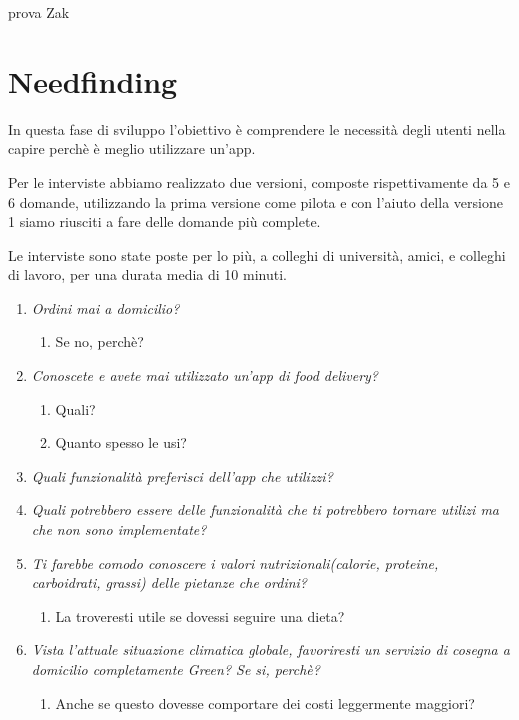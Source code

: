 \documentclass{article}
\begin{document}
prova Zak

    \vspace{1cm}
\section{Needfinding} 
In questa fase di sviluppo l’obiettivo è comprendere le necessità degli utenti nella capire perchè è meglio utilizzare un'app.
    \vspace{1cm}
     \par
\par Per le interviste abbiamo realizzato due versioni, composte rispettivamente da 5 e 6 domande, utilizzando la prima versione come pilota e con l'aiuto della versione 1 siamo riusciti a fare delle domande più complete. \par Le interviste sono state poste per lo più, a colleghi di università, amici, e colleghi di lavoro, per una durata media di 10 minuti.\par
  \vspace{1cm}
\par{}
    \begin{enumerate}
    
     \item \textit{Ordini mai a domicilio?}
        \begin{enumerate}
            \item Se no, perchè?
        \end{enumerate}
     \item \textit{Conoscete e avete mai utilizzato un'app di food delivery?}
     \begin{enumerate}
         \item Quali?
         \item Quanto spesso le usi?
     \end{enumerate}
     \item \textit{Quali funzionalità preferisci dell'app che utilizzi?}
     \item \textit{Quali potrebbero essere delle funzionalità che ti potrebbero tornare utilizi ma che non sono implementate?}
    \item \textit{Ti farebbe comodo conoscere i valori nutrizionali(calorie, proteine, carboidrati, grassi) delle pietanze che ordini?}
    \begin{enumerate}
        \item La troveresti utile se dovessi seguire una dieta?
    \end{enumerate}
    \item \textit{Vista l'attuale situazione climatica globale, favoriresti un servizio di cosegna a domicilio completamente Green? Se si, perchè? }
    \begin{enumerate}
        \item Anche se questo dovesse comportare dei costi leggermente maggiori?
    \end{enumerate}
\end{enumerate}
\end{document}
